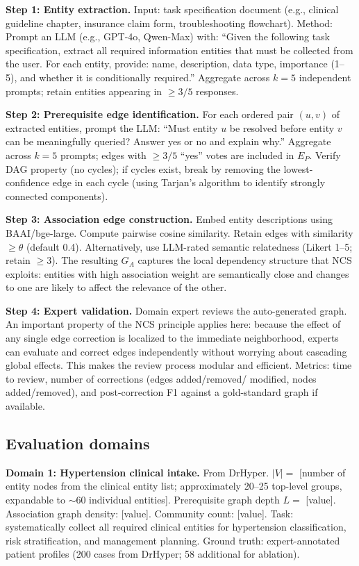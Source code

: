 \documentclass[11pt,a4paper]{article}
\newcommand{\placeholder}[1]{%
  \begin{tcolorbox}[colback=yellow!10,colframe=orange!60!black,
    fonttitle=\bfseries,title=Placeholder]
    #1
  \end{tcolorbox}%
}
\begin{document}
\placeholder{%
  \textbf{Step 1: Entity extraction.}
  Input: task specification document (e.g., clinical guideline chapter,
  insurance claim form, troubleshooting flowchart).
  Method: Prompt an LLM (e.g., GPT-4o, Qwen-Max) with: ``Given the following
  task specification, extract all required information entities that must be
  collected from the user. For each entity, provide: name, description,
  data type, importance (1--5), and whether it is conditionally required.''
  Aggregate across $k=5$ independent prompts; retain entities appearing in
  $\geq 3/5$ responses.

  \textbf{Step 2: Prerequisite edge identification.}
  For each ordered pair $(u, v)$ of extracted entities, prompt the LLM:
  ``Must entity $u$ be resolved before entity $v$ can be meaningfully
  queried? Answer yes or no and explain why.'' Aggregate across $k=5$
  prompts; edges with $\geq 3/5$ ``yes'' votes are included in $E_P$.
  Verify DAG property (no cycles); if cycles exist, break by removing the
  lowest-confidence edge in each cycle (using Tarjan's algorithm to identify
  strongly connected components).

  \textbf{Step 3: Association edge construction.}
  Embed entity descriptions using BAAI/bge-large. Compute pairwise cosine
  similarity. Retain edges with similarity $\geq \theta$ (default 0.4).
  Alternatively, use LLM-rated semantic relatedness (Likert 1--5; retain
  $\geq 3$). The resulting $G_A$ captures the local dependency structure
  that NCS exploits: entities with high association weight are semantically
  close and changes to one are likely to affect the relevance of the other.

  \textbf{Step 4: Expert validation.}
  Domain expert reviews the auto-generated graph. An important property
  of the NCS principle applies here: because the effect of any single edge
  correction is localized to the immediate neighborhood, experts can
  evaluate and correct edges independently without worrying about cascading
  global effects. This makes the review process modular and efficient.
  Metrics: time to review, number of corrections (edges added/removed/
  modified, nodes added/removed), and post-correction F1 against a
  gold-standard graph if available.
}

\subsection{Evaluation domains}
\label{sec:methods_domains}

\placeholder{%
  \textbf{Domain 1: Hypertension clinical intake.}
  From DrHyper. $|V| = $ [number of entity nodes from the clinical entity
  list; approximately 20--25 top-level groups, expandable to $\sim$60
  individual entities]. Prerequisite graph depth $L = $ [value].
  Association graph density: [value]. Community count: [value].
  Task: systematically collect all required clinical entities for
  hypertension classification, risk stratification, and management planning.
  Ground truth: expert-annotated patient profiles (200 cases from DrHyper;
  58 additional for ablation).
}
\end{document}
